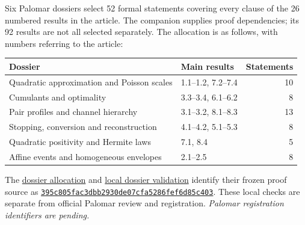 Six Palomar dossiers select 52 formal statements covering every clause
of the 26 numbered results in the article. The companion supplies proof
dependencies; its 92 results are not all selected separately.
The allocation is as follows, with numbers referring to the article:
\begin{center}
\small
\begin{tabularx}{\linewidth}{@{}Xlr@{}}
\toprule
Dossier & Main results & Statements\\
\midrule
Quadratic approximation and Poisson scales & 1.1--1.2, 7.2--7.4 & 10\\
Cumulants and optimality & 3.3--3.4, 6.1--6.2 & 8\\
Pair profiles and channel hierarchy & 3.1--3.2, 8.1--8.3 & 13\\
Stopping, conversion and reconstruction & 4.1--4.2, 5.1--5.3 & 8\\
Quadratic positivity and Hermite laws & 7.1, 8.4 & 5\\
Affine events and homogeneous envelopes & 2.1--2.5 & 8\\
\bottomrule
\end{tabularx}
\end{center}
The
\href{https://github.com/Vulkin-prog/paper-p1-lean/blob/a1c8092f7e25acf7f3b78283039cfbd69491f88e/palomar/REGISTRATION_PLAN_V2.json}{dossier allocation}
and
\href{https://github.com/Vulkin-prog/paper-p1-lean/blob/a1c8092f7e25acf7f3b78283039cfbd69491f88e/palomar/v3/VALIDATION.json}{local dossier validation}
identify their frozen proof source as
\href{https://github.com/Vulkin-prog/paper-p1-lean/tree/395c805fac3dbb2930de07cfa5286fef6d85c403}{\texttt{395c805fac3dbb2930de07cfa5286fef6d85c403}}.
These local checks are separate from official Palomar review and
registration. \emph{Palomar registration identifiers are pending.}
